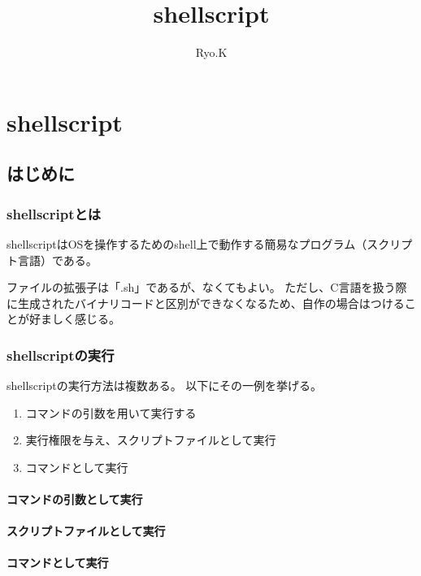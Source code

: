 \documentclass[luatex, a4paper, 12pt]{ltjsbook}
\begin{document}
\title{shellscript}
\author{Ryo.K}
\maketitle

\frontmatter
\section*{}
\tableofcontents    %
\mainmatter



\chapter{shellscript}
\section{はじめに}

\subsection{shellscriptとは}

shellscriptはOSを操作するためのshell上で動作する簡易なプログラム（スクリプト言語）である。

ファイルの拡張子は「.sh」であるが、なくてもよい。
ただし、C言語を扱う際に生成されたバイナリコードと区別ができなくなるため、自作の場合はつけることが好ましく感じる。

\subsection{shellscriptの実行}

shellscriptの実行方法は複数ある。
以下にその一例を挙げる。
\begin{enumerate}
    \item コマンドの引数を用いて実行する                    %
    \item 実行権限を与え、スクリプトファイルとして実行          %
    \item コマンドとして実行                             %
\end{enumerate}

\subsubsection{コマンドの引数として実行}

\subsubsection{スクリプトファイルとして実行}

\subsubsection{コマンドとして実行}


\end{document}
